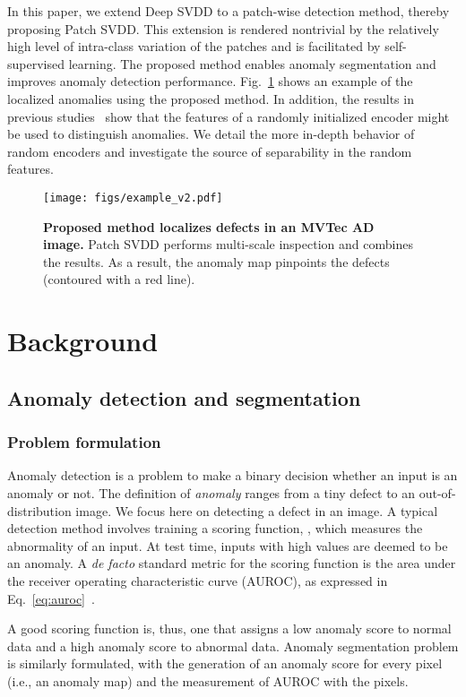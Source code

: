 \documentclass[runningheads]{llncs}
\begin{document}
In this paper, we extend Deep SVDD to a patch-wise detection method, thereby proposing Patch SVDD.
This extension is rendered nontrivial by the relatively high level of intra-class variation of the patches and is facilitated by self-supervised learning.
The proposed method enables anomaly segmentation and improves anomaly detection performance.
Fig.~\ref{fig:example} shows an example of the localized anomalies using the proposed method.
In addition, the results in previous studies~\cite{patch_location,lens} show that the features of a randomly initialized encoder might be used to distinguish anomalies.
We detail the more in-depth behavior of random encoders and investigate the source of separability in the random features.

\begin{figure}[t]
    \centering
    \texttt{[image: figs/example\_v2.pdf]}
    \vspace{-1.6em}
    \caption{
    \textbf{Proposed method localizes defects in an MVTec AD~\cite{mvtecad} image.}
    Patch SVDD performs multi-scale inspection and combines the results.
    As a result, the anomaly map pinpoints the defects (contoured with a red line).
    }
    \label{fig:example}
    \vspace{-1.4em}
\end{figure}
  \section{Background}
\subsection{Anomaly detection and segmentation}
\subsubsection{Problem formulation}  Anomaly detection is a problem to make a binary decision whether an input is an anomaly or not.
The definition of \textit{anomaly} ranges from a tiny defect to an out-of-distribution image.
We focus here on detecting a defect in an image.
A typical detection method involves training a scoring function, , which measures the abnormality of an input.
At test time, inputs with high  values are deemed to be an anomaly.
A \textit{de facto} standard metric for the scoring function is the area under the receiver operating characteristic curve (AUROC), as expressed in Eq.~\ref{eq:auroc}~\cite{auroc}.


A good scoring function is, thus, one that assigns a low anomaly score to normal data and a high anomaly score to abnormal data.
Anomaly segmentation problem is similarly formulated, with the generation of an anomaly score for every pixel (i.e., an anomaly map) and the measurement of AUROC with the pixels.
\end{document}
